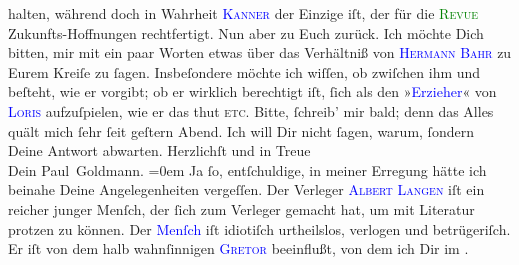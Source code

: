                halten, während doch in Wahrheit \textsc{\textcolor{blue}{Kanner}{}\ledrightnote{\textcolor{blue}{Heinrich Kanner}}} der  Einzige iſt, der für die {\pb}\textsc{\textcolor{green}{Revue}{}} Zukunfts-Hoffnungen rechtfertigt. Nun aber zu Euch zurück. Ich möchte Dich
               bitten, mir mit ein paar Worten etwas über das Verhältniß von \textsc{\textcolor{blue}{Hermann Bahr}{}\ledrightnote{\textcolor{blue}{Hermann Bahr}}} zu Eurem Kreiſe zu ſagen. Insbeſondere möchte ich wiſſen, ob zwiſchen ihm und
                  \label{K_L02623-44v}\label{K_L02623-44h}
               beſteht,  wie er vorgibt; ob er wirklich
               berechtigt iſt, ſich als den »\textcolor{blue}{Erzieher}{}« von \textsc{\textcolor{blue}{Loris}{}\ledrightnote{\textcolor{blue}{Hugo von Hofmannsthal}}} aufzuſpielen, wie er das thut \textsc{etc}. Bitte, ſchreib’
               mir bald; denn das Alles quält mich ſehr ſeit geſtern{ }Abend. Ich will Dir nicht ſagen, warum, ſondern Deine Antwort
               abwarten.\pend
           \pstart
           Herzlichſt und in Treue {\\[\baselineskip]}Dein \spacefill\mbox{Paul Goldmann.}\pend
           \leftskip=0em{}\pstart
           \noindent{}{\pb}Ja ſo, entſchuldige, in meiner Erregung hätte ich
                  beinahe Deine Angelegenheiten vergeſſen. Der Verleger \textcolor{blue}{\textsc{Albert Langen}}{}\ledrightnote{\textcolor{blue}{Albert Langen}} iſt ein reicher junger Menſch, der ſich zum Verleger gemacht hat, um mit
                  Literatur protzen zu können. Der \textcolor{blue}{Menſch}{} iſt idiotiſch urtheilslos,  verlogen und betrügeriſch. Er iſt von dem halb wahnſinnigen \textsc{\textcolor{blue}{Gretor}{}\ledrightnote{\textcolor{blue}{Willy Grétor}}} beeinflußt, von dem ich Dir im \label{K_L02623-4v}\label{K_L02623-4h}.
